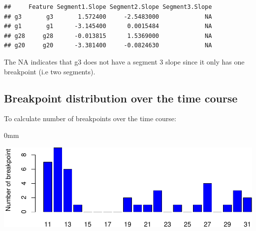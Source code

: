 \documentclass{article}
\begin{document}
\begin{knitrout}
\color{fgcolor}\begin{kframe}
\begin{alltt}
 \hlkwb{<-} 
\hlstd{trendy.summary[}\hlopt{:}\hlstd{,}\hlopt{:}\hlstd{]}
\end{alltt}
\begin{verbatim}
##     Feature Segment1.Slope Segment2.Slope Segment3.Slope
## g3       g3       1.572400     -2.5483000             NA
## g1       g1      -3.145400      0.0015484             NA
## g28     g28      -0.013815      1.5369000             NA
## g20     g20      -3.381400     -0.0824630             NA
\end{verbatim}
\begin{alltt}
\end{alltt}
\end{kframe}
\end{knitrout}
The NA indicates that g3 does not have a segment 3 slope since it only has one
breakpoint (i.e two segments).


\subsection{Breakpoint distribution over the time course}

To calculate number of breakpoints over the time course:

\begin{knitrout}
\color{fgcolor}\begin{kframe}
\begin{alltt}
 \hlkwb{<-} 
 \hlstd{=}\hlstd{,} \hlstd{=}\hlstd{)}
\end{alltt}
\end{kframe}\begin{adjustwidth}{\fltoffset}{0mm}

{\centering \includegraphics[width=.8\textwidth]{figure/unnamed-chunk-15-1} 

}

\end{adjustwidth}
\end{knitrout}
\end{document}
